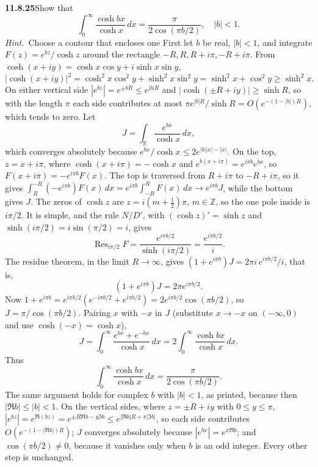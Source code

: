 \par\bigskip
\noindent\textbf{11.8.25}\quad Show that
\[
\int_{0}^{\infty}\frac{\cosh bx}{\cosh x}\,dx
=\frac{\pi}{2\cos(\pi b/2)},\quad|b| < 1.
\]
\emph{Hint.}~Choose a contour that encloses one 
\solution
First let $b$ be real, $|b|<1$, and integrate $F(z)=e^{bz}/\cosh z$
around the rectangle $-R,R,R+i\pi,-R+i\pi$. From
$\cosh(x+iy)=\cosh x\cos y+i\sinh x\sin y$,
\[
|\cosh(x+iy)|^2=\cosh^2x\cos^2y+\sinh^2x\sin^2y
=\sinh^2x+\cos^2y\ge\sinh^2x .
\]
On either vertical side $|e^{bz}|=e^{\pm bR}\le e^{|b|R}$ and
$|\cosh(\pm R+iy)|\ge\sinh R$, so with the length $\pi$ each side
contributes at most $\pi e^{|b|R}/\sinh R=O(e^{-(1-|b|)R})$, which
tends to zero. Let
\[
J=\int_{\mathbb R}\frac{e^{bx}}{\cosh x}\,dx,
\]
which converges absolutely because
$e^{bx}/\cosh x\le2e^{|b||x|-|x|}$.
On the top, $z=x+i\pi$, where $\cosh(x+i\pi)=-\cosh x$ and
$e^{b(x+i\pi)}=e^{i\pi b}e^{bx}$, so $F(x+i\pi)=-e^{i\pi b}F(x)$.
The top is traversed from $R+i\pi$ to $-R+i\pi$, so it gives
$\int_R^{-R}(-e^{i\pi b})F(x)\,dx=e^{i\pi b}\int_{-R}^RF(x)\,dx
\to e^{i\pi b}J$, while the bottom gives $J$.
The zeros of $\cosh z$ are $z=i(m+\frac12)\pi$, $m\in\mathbb Z$, so
the one pole inside is $i\pi/2$. It is simple, and the rule $N/D'$,
with $(\cosh z)'=\sinh z$ and $\sinh(i\pi/2)=i\sin(\pi/2)=i$, gives
\[
\operatorname{Res}_{i\pi/2}F
=\frac{e^{i\pi b/2}}{\sinh(i\pi/2)}
=\frac{e^{i\pi b/2}}i.
\]
The residue theorem, in the limit $R\to\infty$, gives
$(1+e^{i\pi b})J=2\pi i\,e^{i\pi b/2}/i$, that is,
\[
(1+e^{i\pi b})J=2\pi e^{i\pi b/2}.
\]
Now $1+e^{i\pi b}=e^{i\pi b/2}(e^{-i\pi b/2}+e^{i\pi b/2})
=2e^{i\pi b/2}\cos(\pi b/2)$, so
$J=\pi/\cos(\pi b/2)$. Pairing $x$ with $-x$ in $J$ (substitute
$x\to-x$ on $(-\infty,0)$ and use $\cosh(-x)=\cosh x$),
\[
J=\int_0^\infty\frac{e^{bx}+e^{-bx}}{\cosh x}\,dx
=2\int_0^\infty\frac{\cosh bx}{\cosh x}\,dx.
\]
Thus
\[
\boxed{\int_0^\infty\frac{\cosh bx}{\cosh x}\,dx
=\frac{\pi}{2\cos(\pi b/2)}}.
\]
The same argument holds for complex $b$ with $|b|<1$, as printed,
because then $|\Re b|\le|b|<1$. On the vertical sides, where
$z=\pm R+iy$ with $0\le y\le\pi$,
$|e^{bz}|=e^{\Re(bz)}=e^{\pm R\Re b-y\Im b}\le e^{|\Re b|R+\pi|\Im b|}$,
so each side contributes $O(e^{-(1-|\Re b|)R})$; $J$ converges
absolutely because $|e^{bx}|=e^{x\Re b}$; and $\cos(\pi b/2)\ne0$,
because it vanishes only when $b$ is an odd integer. Every other step
is unchanged.

